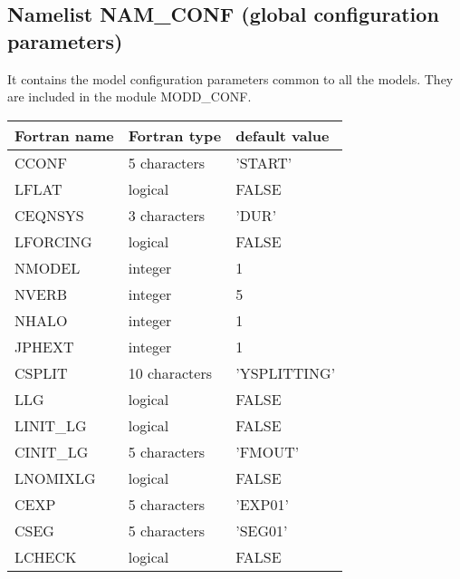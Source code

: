 \subsection{Namelist NAM\_CONF (global configuration parameters)}
It contains the model configuration parameters common to all the models. They
are included in the module MODD\_CONF. 


\begin{center}
\begin{tabular} {|l|l|l|}
\hline
Fortran name & Fortran type & default value \\
\hline
CCONF      &  5 characters  & 'START'  \\
LFLAT      & logical        & FALSE  \\
CEQNSYS    & 3 characters   & 'DUR'    \\
LFORCING   & logical        & FALSE  \\
NMODEL     & integer        & 1      \\
NVERB      & integer        & 5      \\
NHALO      & integer        & 1      \\
JPHEXT     & integer        & 1      \\
CSPLIT     & 10 characters  & 'YSPLITTING' \\
LLG        & logical        & FALSE  \\
LINIT\_LG  & logical        & FALSE  \\
CINIT\_LG  & 5 characters   & 'FMOUT'   \\
LNOMIXLG   & logical        & FALSE  \\
CEXP       & 5 characters   & 'EXP01'  \\
CSEG       & 5 characters   & 'SEG01'  \\
LCHECK     & logical        & FALSE  \\
\hline
\end{tabular}
\end{center}



